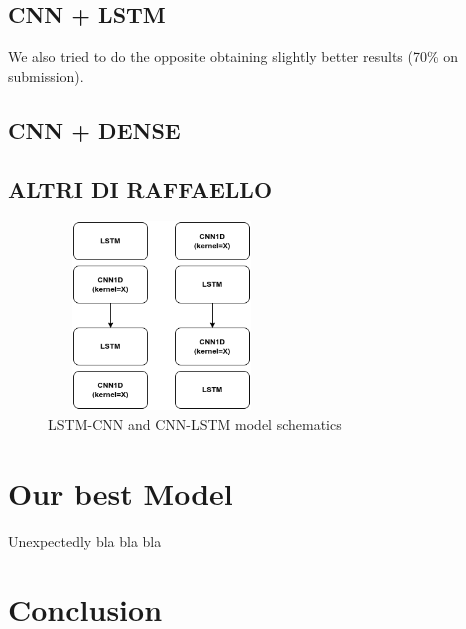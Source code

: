 \documentclass[11pt]{article}
\begin{document}
\subsection{CNN + LSTM}
We also tried to do the opposite obtaining slightly better results (70\% on submission).
\subsection{CNN + DENSE}
\subsection{ALTRI DI RAFFAELLO}

\begin{figure}[h]
  \centering
  \includegraphics[width=6cm, height=5cm]{LSTMCNN}
  \caption{LSTM-CNN and CNN-LSTM model schematics}
\end{figure}

\section{Our best Model}
Unexpectedly bla bla bla





\section{Conclusion}


\end{document}
